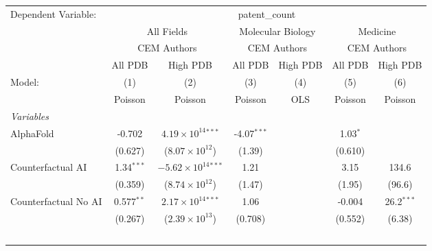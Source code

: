 \begingroup
\centering
\begin{tabular}{lcccccc}
   \tabularnewline \midrule \midrule
   Dependent Variable: & \multicolumn{6}{c}{patent\_count}\\
 & \multicolumn{2}{c}{All Fields} & \multicolumn{2}{c}{Molecular Biology} & \multicolumn{2}{c}{Medicine} \\
\cmidrule(lr){2-3} \cmidrule(lr){4-5} \cmidrule(lr){6-7}
 & \multicolumn{2}{c}{CEM Authors} & \multicolumn{2}{c}{CEM Authors} & \multicolumn{2}{c}{CEM Authors} \\
\cmidrule(lr){2-3} \cmidrule(lr){4-5} \cmidrule(lr){6-7}
 & \multicolumn{1}{c}{All PDB} & \multicolumn{1}{c}{High PDB} & \multicolumn{1}{c}{All PDB} & \multicolumn{1}{c}{High PDB} & \multicolumn{1}{c}{All PDB} & \multicolumn{1}{c}{High PDB} \\
\cmidrule(lr){2-2} \cmidrule(lr){3-3} \cmidrule(lr){4-4} \cmidrule(lr){5-5} \cmidrule(lr){6-6} \cmidrule(lr){7-7}
   Model:                                                     & (1)           & (2)                            & (3)           & (4)  & (5)           & (6)\\  
                                                              &  Poisson      & Poisson                        & Poisson       & OLS  & Poisson       & Poisson\\  
   \midrule
   \emph{Variables}\\
   AlphaFold                                                  & -0.702        & $4.19\times 10^{14}$$^{***}$   & -4.07$^{***}$ &      & 1.03$^{*}$    &   \\   
                                                              & (0.627)       & ($8.07\times 10^{12}$)         & (1.39)        &      & (0.610)       &   \\   
   Counterfactual AI                                          & 1.34$^{***}$  & $-5.62\times 10^{14}$$^{***}$  & 1.21          &      & 3.15          & 134.6\\   
                                                              & (0.359)       & ($8.74\times 10^{12}$)         & (1.47)        &      & (1.95)        & (96.6)\\   
   Counterfactual No AI                                       & 0.577$^{**}$  & $2.17\times 10^{14}$$^{***}$   & 1.06          &      & -0.004        & 26.2$^{***}$\\   
                                                              & (0.267)       & ($2.39\times 10^{13}$)         & (0.708)       &      & (0.552)       & (6.38)\\   
$$
\end{tabular}
